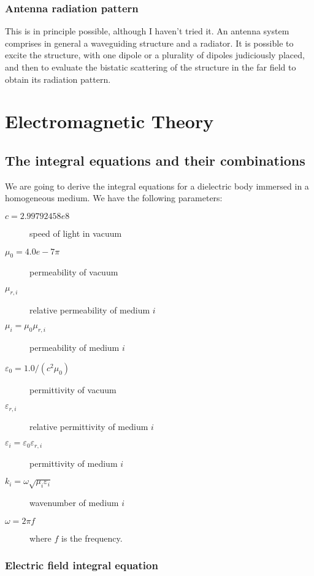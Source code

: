 \documentclass[a4paper,10pt]{book}
\begin{document}
\section{Antenna radiation pattern}
%
\par
This is in principle possible, although I haven't tried it. An antenna system comprises in general a waveguiding structure and a radiator. It is possible to excite the structure, with one dipole or a plurality of dipoles judiciously placed, and then to evaluate the bistatic scattering of the structure in the far field to obtain its radiation pattern.


\part{Electromagnetic Theory}


\chapter{The integral equations and their combinations}
%
\par
We are going to derive the integral equations for a dielectric body immersed in a homogeneous medium. We have the following parameters:
\begin{description}
\item [$c = 2.99792458e8$] speed of light in vacuum
\item [$\mu_0 = 4.0e-7 \pi$] permeability of vacuum
\item [$\mu_{r, i}$] relative permeability of medium $i$
\item [$\mu_i = \mu_0\mu_{r, i}$] permeability of medium $i$
\item [$\varepsilon_0 = 1.0/(c^2 \mu_0)$] permittivity of vacuum
\item [$\varepsilon_{r, i}$] relative permittivity of medium $i$
\item [$\varepsilon_i = \varepsilon_0\varepsilon_{r, i}$] permittivity of medium $i$
\item [$k_i = \omega \sqrt{\mu_i \varepsilon_i}$] wavenumber of medium $i$ 
\item [$\omega = 2 \pi f$] where $f$ is the frequency.
\end{description}

\section{Electric field integral equation}
\end{document}
